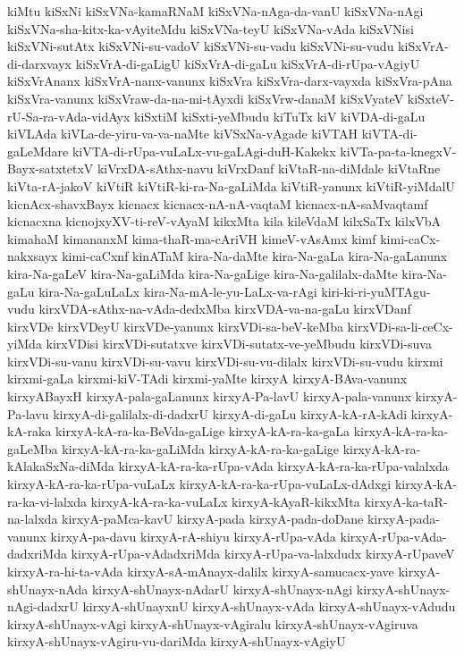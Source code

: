 {kiMtu
kiSxNi
kiSxVNa-kamaRNaM
kiSxVNa-nAga-da-vanU
kiSxVNa-nAgi
kiSxVNa-sha-kitx-ka-vAyiteMdu
kiSxVNa-teyU
kiSxVNa-vAda
kiSxVNisi
kiSxVNi-sutAtx
kiSxVNi-su-vadoV
kiSxVNi-su-vadu
kiSxVNi-su-vudu
kiSxVrA-di-darxvayx
kiSxVrA-di-gaLigU
kiSxVrA-di-gaLu
kiSxVrA-di-rUpa-vAgiyU
kiSxVrAnanx
kiSxVrA-nanx-vanunx
kiSxVra
kiSxVra-darx-vayxda
kiSxVra-pAna
kiSxVra-vanunx
kiSxVraw-da-na-mi-tAyxdi
kiSxVrw-danaM
kiSxVyateV
kiSxteV-rU-Sa-ra-vAda-vidAyx
kiSxtiM
kiSxti-yeMbudu
kiTuTx
kiV
kiVDA-di-gaLu
kiVLAda
kiVLa-de-yiru-va-va-naMte
kiVSxNa-vAgade
kiVTAH
kiVTA-di-gaLeMdare
kiVTA-di-rUpa-vuLaLx-vu-gaLAgi-duH-Kakekx
kiVTa-pa-ta-knegxV-Bayx-satxtetxV
kiVrxDA-sAthx-navu
kiVrxDanf
kiVtaR-na-diMdale
kiVtaRne
kiVta-rA-jakoV
kiVtiR
kiVtiR-ki-ra-Na-gaLiMda
kiVtiR-yanunx
kiVtiR-yiMdalU
kicnAcx-shavxBayx
kicnacx
kicnacx-nA-nA-vaqtaM
kicnacx-nA-saMvaqtamf
kicnacxna
kicnojxyXV-ti-reV-vAyaM
kikxMta
kila
kileVdaM
kilxSaTx
kilxVbA
kimahaM
kimananxM
kima-thaR-ma-cAriVH
kimeV-vAsAmx
kimf
kimi-caCx-nakxsayx
kimi-caCxnf
kinATaM
kira-Na-daMte
kira-Na-gaLa
kira-Na-gaLanunx
kira-Na-gaLeV
kira-Na-gaLiMda
kira-Na-gaLige
kira-Na-galilalx-daMte
kira-Na-gaLu
kira-Na-gaLuLaLx
kira-Na-mA-le-yu-LaLx-va-rAgi
kiri-ki-ri-yuMTAgu-vudu
kirxVDA-sAthx-na-vAda-dedxMba
kirxVDA-va-na-gaLu
kirxVDanf
kirxVDe
kirxVDeyU
kirxVDe-yanunx
kirxVDi-sa-beV-keMba
kirxVDi-sa-li-ceCx-yiMda
kirxVDisi
kirxVDi-sutatxve
kirxVDi-sutatx-ve-yeMbudu
kirxVDi-suva
kirxVDi-su-vanu
kirxVDi-su-vavu
kirxVDi-su-vu-dilalx
kirxVDi-su-vudu
kirxmi
kirxmi-gaLa
kirxmi-kiV-TAdi
kirxmi-yaMte
kirxyA
kirxyA-BAva-vanunx
kirxyABayxH
kirxyA-pala-gaLanunx
kirxyA-Pa-lavU
kirxyA-pala-vanunx
kirxyA-Pa-lavu
kirxyA-di-galilalx-di-dadxrU
kirxyA-di-gaLu
kirxyA-kA-rA-kAdi
kirxyA-kA-raka
kirxyA-kA-ra-ka-BeVda-gaLige
kirxyA-kA-ra-ka-gaLa
kirxyA-kA-ra-ka-gaLeMba
kirxyA-kA-ra-ka-gaLiMda
kirxyA-kA-ra-ka-gaLige
kirxyA-kA-ra-kAlakaSxNa-diMda
kirxyA-kA-ra-ka-rUpa-vAda
kirxyA-kA-ra-ka-rUpa-valalxda
kirxyA-kA-ra-ka-rUpa-vuLaLx
kirxyA-kA-ra-ka-rUpa-vuLaLx-dAdxgi
kirxyA-kA-ra-ka-vi-lalxda
kirxyA-kA-ra-ka-vuLaLx
kirxyA-kAyaR-kikxMta
kirxyA-ka-taR-na-lalxda
kirxyA-paMca-kavU
kirxyA-pada
kirxyA-pada-doDane
kirxyA-pada-vanunx
kirxyA-pa-davu
kirxyA-rA-shiyu
kirxyA-rUpa-vAda
kirxyA-rUpa-vAda-dadxriMda
kirxyA-rUpa-vAdadxriMda
kirxyA-rUpa-va-lalxdudx
kirxyA-rUpaveV
kirxyA-ra-hi-ta-vAda
kirxyA-sA-mAnayx-dalilx
kirxyA-samucacx-yave
kirxyA-shUnayx-nAda
kirxyA-shUnayx-nAdarU
kirxyA-shUnayx-nAgi
kirxyA-shUnayx-nAgi-dadxrU
kirxyA-shUnayxnU
kirxyA-shUnayx-vAda
kirxyA-shUnayx-vAdudu
kirxyA-shUnayx-vAgi
kirxyA-shUnayx-vAgiralu
kirxyA-shUnayx-vAgiruva
kirxyA-shUnayx-vAgiru-vu-dariMda
kirxyA-shUnayx-vAgiyU
}
